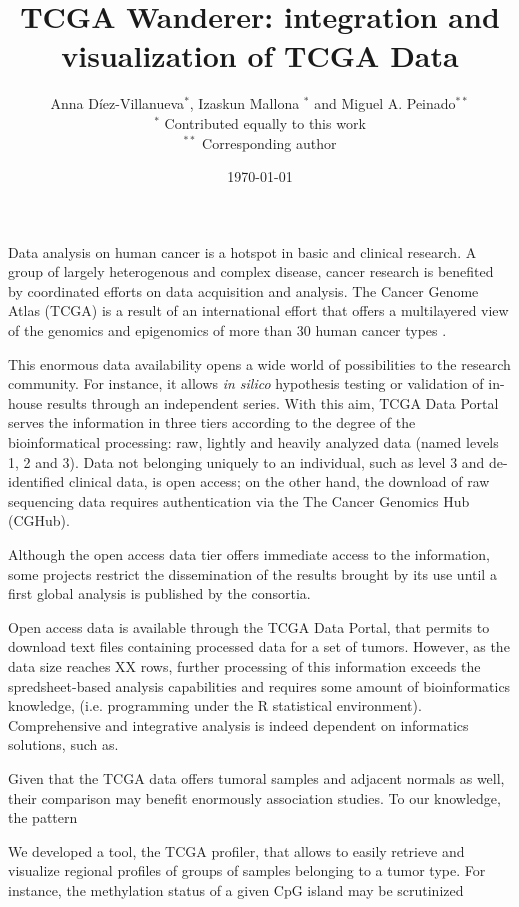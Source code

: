 \documentclass{article}
\title{TCGA Wanderer: integration and visualization of TCGA Data}
\author{Anna D{\'i}ez-Villanueva$^*$, Izaskun Mallona $^*$ and Miguel A. Peinado$^{**}$ \\
\vspace{1cm}
 $^*$ Contributed equally to this work \\
 $^{**}$ Corresponding author
}
\date{\today}
\begin{document}
\maketitle



Data analysis on human cancer is a hotspot in basic and clinical research. A group of largely heterogenous and complex disease, cancer research is benefited by coordinated efforts on data acquisition and analysis. The Cancer Genome Atlas (TCGA) is a result of an international effort that offers a multilayered view of the genomics and epigenomics of more than 30 human cancer types \cite{weinstein2013cancer}.

This enormous data availability opens a wide world of possibilities to the research community. For instance, it allows \textit{in silico} hypothesis testing or validation of in-house results through an independent series. With this aim, TCGA Data Portal serves the information in three tiers according to the degree of the bioinformatical processing: raw, lightly and heavily analyzed data (named levels 1, 2 and 3). Data not belonging uniquely to an individual, such as level 3 and de-identified clinical data, is open access; on the other hand, the download of raw sequencing data requires authentication via the The Cancer Genomics Hub (CGHub)\cite{wilks2014cancer}. 

Although the open access data tier offers immediate access to the information, some projects restrict the dissemination of the results brought by its use until a first global analysis is published by the consortia.

Open access data is available through the TCGA Data Portal, that permits to download text files containing processed data for a set of tumors. However, as the data size reaches XX rows, further processing of this information exceeds the spredsheet-based analysis capabilities and requires some amount of bioinformatics knowledge, (i.e. programming under the R statistical environment). Comprehensive and integrative analysis is indeed dependent on informatics solutions, such as.


Given that the TCGA data offers tumoral samples and adjacent normals as well, their comparison may benefit enormously association studies. To our knowledge, the pattern 

We developed a tool, the TCGA profiler, that allows to easily retrieve and visualize regional profiles of groups of samples belonging to a tumor type. For instance, the methylation status of a given CpG island may be scrutinized
\end{document}
